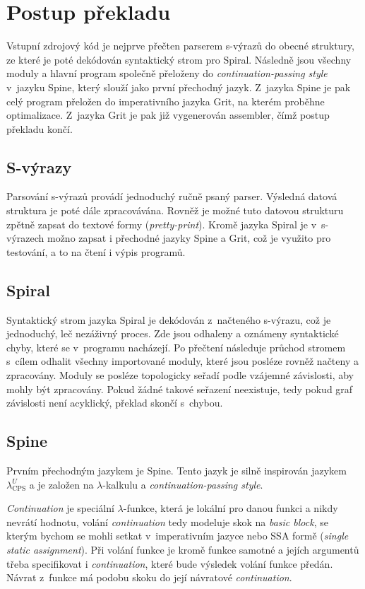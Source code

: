 \chapter{Postup překladu}

Vstupní zdrojový kód je nejprve přečten parserem s-výrazů do obecné struktury,
ze které je poté dekódován syntaktický strom pro Spiral. Následně jsou všechny
moduly a hlavní program společně přeloženy do \emph{continuation-passing style}
v~jazyku Spine, který slouží jako první přechodný jazyk. Z~jazyka Spine je pak
celý program přeložen do imperativního jazyka Grit, na kterém proběhne
optimalizace.  Z~jazyka Grit je pak již vygenerován assembler, čímž postup
překladu končí. 

\section{S-výrazy}

Parsování s-výrazů provádí jednoduchý ručně psaný parser. Výsledná datová
struktura je poté dále zpracovávána. Rovněž je možné tuto datovou strukturu
zpětně zapsat do textové formy (\emph{pretty-print}). Kromě jazyka Spiral je
v~s-výrazech možno zapsat i přechodné jazyky Spine a Grit, což je využito pro
testování, a to na čtení i výpis programů.

\section{Spiral}

Syntaktický strom jazyka Spiral je dekódován z~načteného s-výrazu, což je
jednoduchý, leč nezáživný proces. Zde jsou odhaleny a oznámeny syntaktické
chyby, které se v~programu nacházejí. Po přečtení následuje průchod stromem
s~cílem odhalit všechny importované moduly, které jsou posléze rovněž načteny a
zpracovány. Moduly se posléze topologicky seřadí podle vzájemné závislosti, aby
mohly být zpracovány. Pokud žádné takové seřazení neexistuje, tedy pokud graf
závislosti není acyklický, překlad skončí s~chybou.

\section{Spine}

Prvním přechodným jazykem je Spine. Tento jazyk je silně inspirován jazykem
$\lambda^U_\text{CPS}$ \cite{kennedy2007compiling} a je založen na
$\lambda$-kalkulu a \emph{continuation-passing style}.

\emph{Continuation} je speciální $\lambda$-funkce, která je lokální pro danou
funkci a nikdy nevrátí hodnotu, volání \emph{continuation} tedy modeluje skok na
\emph{basic block}, se kterým bychom se mohli setkat v~imperativním jazyce nebo
SSA formě (\emph{single static assignment}). Při volání funkce je kromě funkce
samotné a jejích argumentů třeba specifikovat i \emph{continuation}, které bude
výsledek volání funkce předán. Návrat z~funkce má podobu skoku do její návratové
\emph{continuation}.

